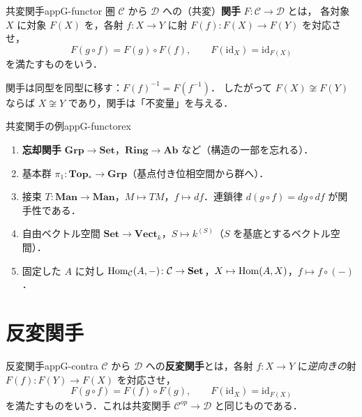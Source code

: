 \begin{mydef}{共変関手}{appG-functor}
圏 $\mathcal C$ から $\mathcal D$ への（共変）\textbf{関手} $F\colon\mathcal C\to\mathcal D$ とは，
各対象 $X$ に対象 $F(X)$ を，各射 $f\colon X\to Y$ に射 $F(f)\colon F(X)\to F(Y)$ を対応させ，
\[
F(g\circ f)=F(g)\circ F(f),\qquad F(\mathrm{id}_X)=\mathrm{id}_{F(X)}
\]
を満たすものをいう．
\end{mydef}

関手は同型を同型に移す：$F(f)^{-1}=F(f^{-1})$．
したがって $F(X)\not\cong F(Y)$ ならば $X\not\cong Y$ であり，関手は「不変量」を与える．

\begin{myex}{共変関手の例}{appG-functorex}
\begin{enumerate}
\item \textbf{忘却関手} $\mathbf{Grp}\to\mathbf{Set}$，$\mathbf{Ring}\to\mathbf{Ab}$ など（構造の一部を忘れる）．
\item 基本群 $\pi_1\colon\mathbf{Top}_*\to\mathbf{Grp}$（基点付き位相空間から群へ）．
\item 接束 $T\colon\mathbf{Man}\to\mathbf{Man}$，$M\mapsto TM$，$f\mapsto df$．連鎖律 $d(g\circ f)=dg\circ df$ が関手性である．
\item 自由ベクトル空間 $\mathbf{Set}\to\mathbf{Vect}_k$，$S\mapsto k^{(S)}$（$S$ を基底とするベクトル空間）．
\item 固定した $A$ に対し $\operatorname{Hom}_{\mathcal C}(A,-)\colon\mathcal C\to\mathbf{Set}$，$X\mapsto\operatorname{Hom}(A,X)$，$f\mapsto f\circ(-)$．
\end{enumerate}
\end{myex}

\section{反変関手}

\begin{mydef}{反変関手}{appG-contra}
$\mathcal C$ から $\mathcal D$ への\textbf{反変関手}とは，各射 $f\colon X\to Y$ に\emph{逆向きの}射 $F(f)\colon F(Y)\to F(X)$ を対応させ，
\[
F(g\circ f)=F(f)\circ F(g),\qquad F(\mathrm{id}_X)=\mathrm{id}_{F(X)}
\]
を満たすものをいう．これは共変関手 $\mathcal C^{op}\to\mathcal D$ と同じものである．
\end{mydef}

